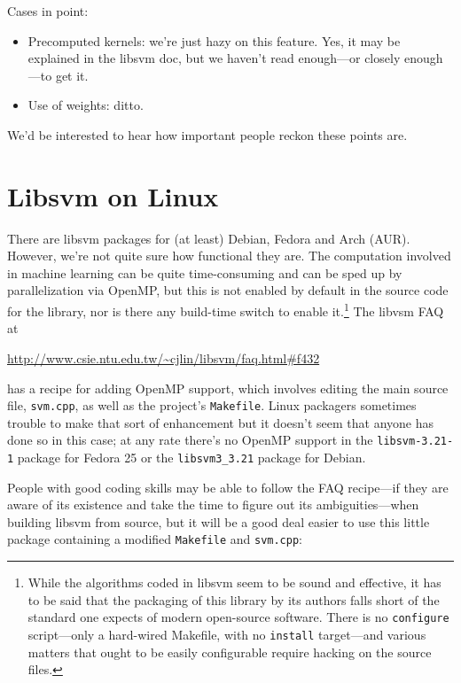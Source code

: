 \documentclass{article}
\begin{document}
Cases in point:

\begin{itemize}
\item Precomputed kernels: we're just hazy on this feature. Yes, it
  may be explained in the \textsf{libsvm} doc, but we haven't read
  enough---or closely enough---to get it.
\item Use of weights: ditto.
\end{itemize}

We'd be interested to hear how important people reckon these points
are.

\section{Libsvm on Linux}
\label{sec:linux}

There are \textsf{libsvm} packages for (at least) Debian, Fedora and
Arch (AUR). However, we're not quite sure how functional they are. The
computation involved in machine learning can be quite time-consuming
and can be sped up by parallelization via \textsf{OpenMP},
but this is not enabled by default in the source code for the library,
nor is there any build-time switch to enable it.\footnote{While the
  algorithms coded in \textsf{libsvm} seem to be sound and effective,
  it has to be said that the packaging of this library by its authors
  falls short of the standard one expects of modern open-source
  software. There is no \texttt{configure} script---only a hard-wired
  Makefile, with no \texttt{install} target---and various matters that
  ought to be easily configurable require hacking on the source
  files.}  The \textsf{libvsm} FAQ at

\url{http://www.csie.ntu.edu.tw/~cjlin/libsvm/faq.html#f432}

has a recipe for adding \textsf{OpenMP} support, which involves
editing the main source file, \texttt{svm.cpp}, as well as the
project's \texttt{Makefile}. Linux packagers sometimes trouble to
make that sort of enhancement but it doesn't seem that anyone has done
so in this case; at any rate there's no \textsf{OpenMP} support in the
\texttt{libsvm-3.21-1} package for Fedora 25 or the
\texttt{libsvm3\_3.21} package for Debian.

People with good coding skills may be able to follow the FAQ
recipe---if they are aware of its existence and take the time to
figure out its ambiguities---when building \textsf{libsvm} from
source, but it will be a good deal easier to use this little package
containing a modified \texttt{Makefile} and \texttt{svm.cpp}:
\end{document}
